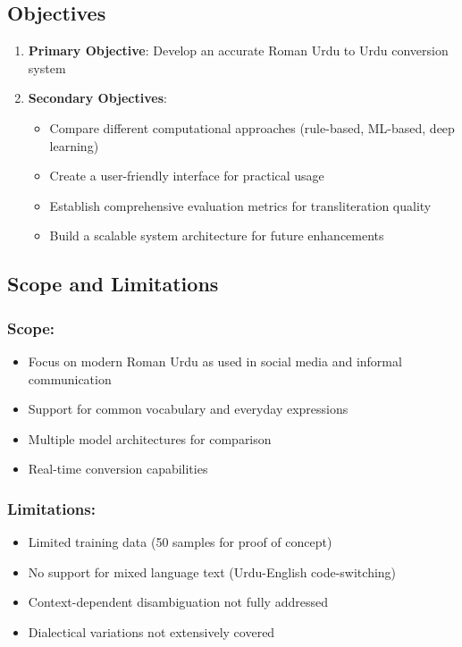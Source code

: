 \documentclass[10pt,twocolumn]{article}
\begin{document}
\subsection{Objectives}
\begin{enumerate}[label=\arabic*.]
    \item \textbf{Primary Objective}: Develop an accurate Roman Urdu to Urdu conversion system
    \item \textbf{Secondary Objectives}:
    \begin{itemize}[leftmargin=*,noitemsep,topsep=0pt,parsep=0pt,partopsep=0pt]
        \item Compare different computational approaches (rule-based, ML-based, deep learning)
        \item Create a user-friendly interface for practical usage
        \item Establish comprehensive evaluation metrics for transliteration quality
        \item Build a scalable system architecture for future enhancements
    \end{itemize}
\end{enumerate}

\subsection{Scope and Limitations}
\subsubsection*{Scope:}
\begin{itemize}[leftmargin=*,noitemsep,topsep=0pt,parsep=0pt,partopsep=0pt]
    \item Focus on modern Roman Urdu as used in social media and informal communication
    \item Support for common vocabulary and everyday expressions
    \item Multiple model architectures for comparison
    \item Real-time conversion capabilities
\end{itemize}

\subsubsection*{Limitations:}
\begin{itemize}[leftmargin=*,noitemsep,topsep=0pt,parsep=0pt,partopsep=0pt]
    \item Limited training data (50 samples for proof of concept)
    \item No support for mixed language text (Urdu-English code-switching)
    \item Context-dependent disambiguation not fully addressed
    \item Dialectical variations not extensively covered
\end{itemize}
\end{document}
